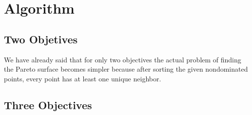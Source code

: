 \documentclass{stdlocal}
\begin{document}
\section{Algorithm} %
\label{sec:algorithm}
  \subsection{Two Objetives} %
  \label{sub:two_objectives}
    We have already said that for only two objectives the actual problem of finding the Pareto surface becomes simpler because after sorting the given nondominated points, every point has at least one unique neighbor.
  \subsection{Three Objectives} %
  \label{sub:three_objectives}

\end{document}
